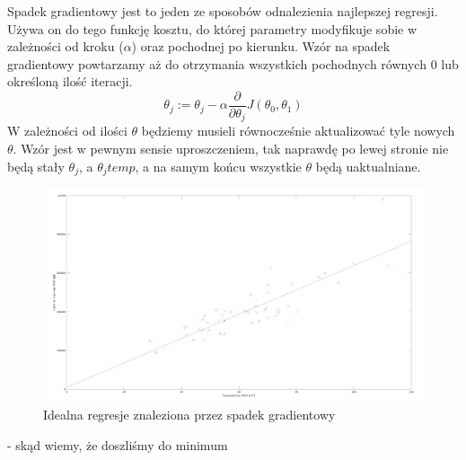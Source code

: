 \noindent
Spadek gradientowy jest to jeden ze sposobów odnalezienia najlepszej regresji. Używa on do tego funkcję kosztu, do której parametry modyfikuje sobie w zależności od kroku ($\alpha$) oraz pochodnej po kierunku. Wzór na spadek gradientowy powtarzamy aż do otrzymania wszystkich pochodnych równych 0 lub określoną ilość iteracji.
\large
$$
\theta_{j} := \theta_{j} - \alpha \frac{\partial}{\partial\theta_{j}} J(\theta_{0}, \theta_{1})
$$
\normalsize
\noindent
\newline
W zależności od ilości $\theta$ będziemy musieli równocześnie aktualizować tyle nowych $\theta$. Wzór jest w pewnym sensie uproszczeniem, tak naprawdę po lewej stronie nie będą stały $\theta_{j}$, a $\theta_{j}temp$, a na samym końcu wszystkie $\theta$ będą uaktualniane. 


	\begin{figure}[H]
    \centering
    \includegraphics[scale=0.22]{PNG/perfect_grad.png}
    \caption{Idealna regresje znaleziona przez spadek gradientowy}
    \label{lamana}
	\end{figure}
	

- skąd wiemy, że doszliśmy do minimum \\